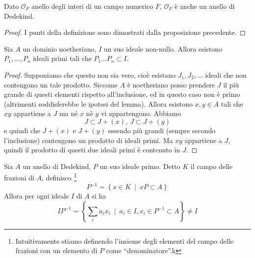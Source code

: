 \begin{teorema}
	Dato $\mathcal{O}_F$ anello degli interi di un campo numerico $F$, $\mathcal{O}_F$ è anche un anello di Dedekind.
\end{teorema}
\begin{proof}
	I punti della definizione sono dimostrati dalla proposizione precedente.
\end{proof}
\label{lezione21}
\begin{proposizione}
	Sia $A$ un dominio noetheriano, $I$ un suo ideale non-nullo. Allora esistono $P_1,\dots,P_n$ ideali primi tali che $P_1\dots P_n\subset I$.
\end{proposizione}
\begin{proof}
	Supponiamo che questo non sia vero, cioè esistano $J_1,J_2,\dots$ ideali che non contengono un tale prodotto. Siccome $A$ è noetheriano posso prendere $J$ il più grande di questi elementi rispetto all'inclusione, ed in questo caso non è primo (altrimenti soddisferebbe le ipotesi del lemma). Allora esistono $x,y\in A$ tali che $xy$ appartiene a $J$ ma né $x$ nè $y$ vi appartengono. Abbiamo  
	\begin{equation*}
	J\subset J+(x), \ J \subset J+(y)
	\end{equation*}
	e quindi che $J+(x)$ e $J+(y)$ essendo più grandi (sempre secondo l'inclusione) contengono un prodotto di ideali primi. Ma $xy$ appartiene a $J$, quindi il prodotto di questi due ideali primi è contenuto in $J$.
\end{proof}
\begin{proposizione}
	Sia $A$ un anello di Dedekind, $P$ un suo ideale primo. Detto $K$ il campo delle frazioni di $A$, definisco \footnote{Intuitivamente stiamo definendo l'insieme degli elementi del campo delle frazioni con un elemento di $P$ come \enquote{denominatore}.k}
	\begin{equation*}
	P^{-1}=\left\{x\in K\ \mid \ xP\subset A\right\}
	\end{equation*}
	Allora per ogni ideale $I$ di $A$ si ha 
	\begin{equation*}
	IP^{-1}=\left\{\sum_i a_ix_i\ \mid \ a_i\in I, x_i\in P^{-1}\subset A\right\}\neq I
	\end{equation*}
\end{proposizione}
